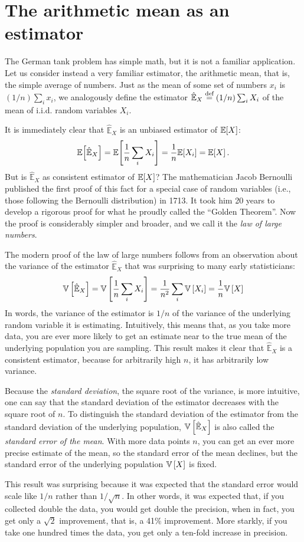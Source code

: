 \section{The arithmetic mean as an estimator}

The German tank problem has simple math, but it is not a familiar application. Let us consider instead a very familiar estimator, the arithmetic mean, that is, the simple average of numbers. Just as the mean of some set of numbers $x_i$ is $(1/n) \sum_i x_i$, we analogously define the estimator $\hat{\mathbb{E}}_X \stackrel{\text{def}}{=} (1/n) \sum_i X_i$ of the mean of i.i.d. random variables $X_i$.

It is immediately clear that $\hat{\mathbb{E}}_X$ is an unbiased estimator of $\mathbb{E}\!\left[{X}\right]$:
\begin{equation*}
    \mathbb{E}\!\left[{\hat{\mathbb{E}}_X}\right] = \mathbb{E}\!\left[{\frac{1}{n} \sum_i X_i}\right] = \frac{1}{n} \mathbb{E}\!\left[{X_i}\right] = \mathbb{E}\!\left[{X}\right].
\end{equation*}
But is $\hat{\mathbb{E}}_X$ as consistent estimator of $\mathbb{E}\!\left[{X}\right]$? The mathematician Jacob Bernoulli published the first proof of this fact for a special case of random variables (i.e., those following the Bernoulli distribution) in 1713. It took him 20 years to develop a rigorous proof for what he proudly called the ``Golden Theorem''. Now the proof is considerably simpler and broader, and we call it the \emph{law of large numbers}.

The modern proof of the law of large numbers follows from an observation about the variance of the estimator $\hat{\mathbb{E}}_X$ that was surprising to many early statisticians:
\begin{equation*}
    \mathbb{V}\left[{\hat{\mathbb{E}}_X}\right] = \mathbb{V}\left[{\frac{1}{n} \sum_i X_i}\right] = \frac{1}{n^2} \sum_i \mathbb{V}\left[{X_i}\right] = \frac{1}{n} \mathbb{V}\left[{X}\right]
\end{equation*}
In words, the variance of the estimator is $1/n$ of the variance of the underlying random variable it is estimating. Intuitively, this means that, as you take more data, you are ever more likely to get an estimate near to the true mean of the underlying population you are sampling. This result makes it clear that $\hat{\mathbb{E}}_X$ is a consistent estimator, because for arbitrarily high $n$, it has arbitrarily low variance.

Because the \emph{standard deviation}, the square root of the variance, is more intuitive, one can say that the standard deviation of the estimator decreases with the square root of $n$. To distinguish the standard deviation of the estimator from the standard deviation of the underlying population, $\mathbb{V}\left[{\hat{\mathbb{E}}_X}\right]$ is also called the \emph{standard error of the mean}. With more data points $n$, you can get an ever more precise estimate of the mean, so the standard error of the mean declines, but the standard error of the underlying population $\mathbb{V}\left[{X}\right]$ is fixed.

This result was surprising because it was expected that the standard error would scale like $1/n$ rather than $1/\sqrt{n}$. In other words, it was expected that, if you collected double the data, you would get double the precision, when in fact, you get only a $\sqrt{2}$ improvement, that is, a 41\% improvement. More starkly, if you take one hundred times the data, you get only a ten-fold increase in precision.
